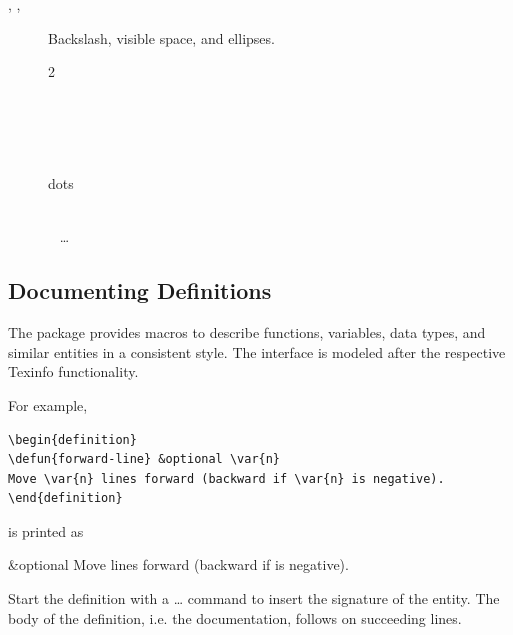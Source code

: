 \documentclass{scrartcl}
\begin{document}
{\begin{definition}
\begin{description}
\item[\code{\\\\}, \code{\\\ }, \code{\\dots}]
\symindex{\\}
\texindexvisiblespace
{}
Backslash, visible space, and ellipses.
\begin{multicols}{2}
\begin{metasyntax}
\\\\
\\\ {}
\\dots
\end{metasyntax}
\columnbreak
\begin{metasyntax}
\\
\ {}
\dots
\end{metasyntax}
\end{multicols}
\end{description}
\end{definition}


\subsection{Documenting Definitions}

The  package provides macros to describe functions,
variables, data types, and similar entities in a consistent style.
The interface is modeled after the respective Texinfo functionality.

For example,
\begin{display}
\begin{verbatim}
\begin{definition}
\defun{forward-line} &optional \var{n}
Move \var{n} lines forward (backward if \var{n} is negative).
\end{definition}
\end{verbatim}
\end{display}
is printed as
\begin{display}
\begin{definition}
 &optional 
Move  lines forward (backward if  is negative).
\end{definition}
\end{display}

Start the definition with a \symb{\def}\ldots{} command to insert
the signature of the entity.  The body of the definition, i.e. the
documentation, follows on succeeding lines.

}
\end{document}
